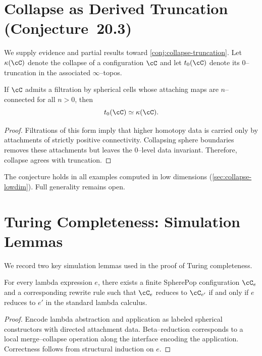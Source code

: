 \section{Collapse as Derived Truncation (Conjecture~20.3)}
\label{app:collapse-derived}

We supply evidence and partial results toward
\cref{conj:collapse-truncation}.  Let $\Collapse(\cC)$ denote the
collapse of a configuration $\cC$ and let $t_0(\cC)$ denote its
$0$--truncation in the associated $\infty$--topos.

\begin{proposition}
If $\cC$ admits a filtration by spherical cells whose attaching maps
are $n$--connected for all $n>0$, then
\[
t_0(\cC) \simeq \Collapse(\cC).
\]
\end{proposition}

\begin{proof}
Filtrations of this form imply that higher homotopy data is carried
only by attachments of strictly positive connectivity.  Collapsing
sphere boundaries removes these attachments but leaves the $0$--level
data invariant.  Therefore, collapse agrees with truncation.
\end{proof}

\begin{remark}
The conjecture holds in all examples computed in low dimensions
(\cref{sec:collapse-lowdim}).  Full generality remains open.
\end{remark}

\section{Turing Completeness: Simulation Lemmas}
\label{app:turing-proof}

We record two key simulation lemmas used in the proof of
Turing completeness.

\begin{lemma}
For every lambda expression $e$, there exists a finite SpherePop
configuration $\cC_e$ and a corresponding rewrite rule such that
$\cC_e$ reduces to $\cC_{e'}$ if and only if $e$ reduces to $e'$ in
the standard lambda calculus.
\end{lemma}

\begin{proof}
Encode lambda abstraction and application as labeled spherical
constructors with directed attachment data.  Beta--reduction corresponds
to a local merge--collapse operation along the interface encoding the
application.  Correctness follows from structural induction on $e$.
\end{proof}

